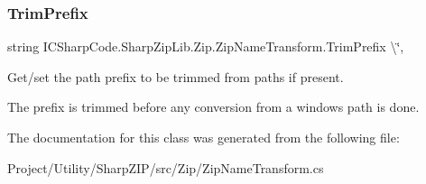 \subsubsection{\texorpdfstring{Trim\+Prefix}{TrimPrefix}}
{\footnotesize\ttfamily string I\+C\+Sharp\+Code.\+Sharp\+Zip\+Lib.\+Zip.\+Zip\+Name\+Transform.\+Trim\+Prefix \textbackslash{}\char`\"{}\hspace{0.3cm}{\ttfamily [get]}, {\ttfamily [set]}}



Get/set the path prefix to be trimmed from paths if present. 

The prefix is trimmed before any conversion from a windows path is done.

The documentation for this class was generated from the following file\+:\begin{DoxyCompactItemize}
\item 
Project/\+Utility/\+Sharp\+Z\+I\+P/src/\+Zip/Zip\+Name\+Transform.\+cs\end{DoxyCompactItemize}
